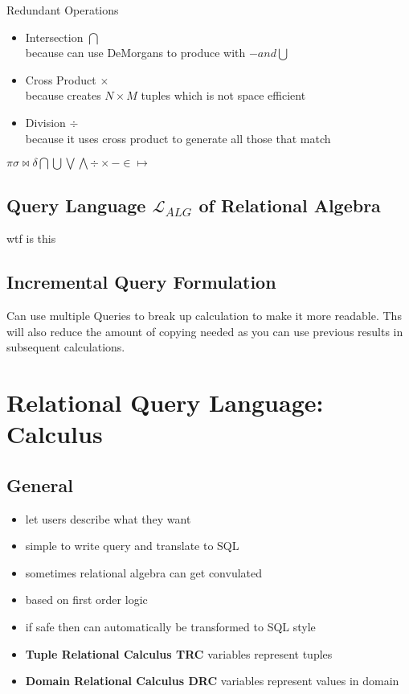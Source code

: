 \documentclass{article}
\newcommand\tab[1][0.5cm]{\hspace*{#1}}
\begin{document}
		Redundant Operations
		\begin{itemize}
			\item Intersection $\bigcap$
			\\ \tab because can use DeMorgans to produce with $- and \bigcup$

			\item Cross Product $\times$
			\\ \tab because creates $N\times M$ tuples which is not space efficient

			\item Division $\div$
			\\ \tab because it uses cross product to generate all those that match
		\end{itemize}

		$\pi \sigma \bowtie \delta \bigcap \bigcup \bigvee \bigwedge \div \times - \in \mapsto$

	\subsection{Query Language $\mathcal{L} _{ALG}$ of Relational Algebra}
		wtf is this

	\subsection{Incremental Query Formulation}
		Can use multiple Queries to break up calculation to make it more readable. Ths will also reduce the amount of copying needed as you can use previous results in subsequent calculations.

\section{Relational Query Language: Calculus}
	\subsection{General}
		\begin{itemize}
			\item let users describe what they want
			\item simple to write query and translate to SQL
			\item sometimes relational algebra can get convulated
			\item based on first order logic
			\item if safe then can automatically be transformed to SQL style
			\item \textbf{Tuple Relational Calculus TRC} variables represent tuples
			\item \textbf{Domain Relational Calculus DRC} variables represent values in domain
		\end{itemize}
\end{document}
